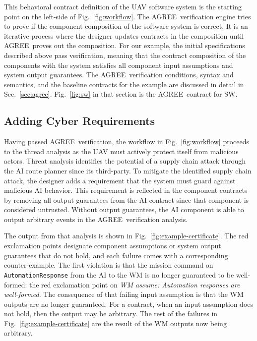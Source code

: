 \documentclass[global,twocolumn]{svjour}
\newcommand{\figref}[1]{Fig.~\ref{#1}}
\newcommand{\secref}[1]{Sec.~\ref{#1}}
\newcommand{\agr}{AGREE}
\begin{document}
This behavioral contract definition of the UAV software system is the starting point on the left-side of \figref{fig:workflow}.
%
The \agr\ verification engine tries to prove if the component composition of the software system is correct.
%
It is an iterative process where the designer updates contracts in the composition until \agr\ proves out the composition.
%
For our example, the initial specifications described above pass verification, meaning that the contract composition of the components with the system satisfies all component input assumptions and system output guarantees.
%
The \agr\ verification conditions, syntax and semantics, and the baseline contracts for the example are discussed in detail in \secref{sec:agree}.
%
\figref{fig:sw} in that section is the \agr\ contract for SW.


\subsection{Adding Cyber Requirements}

Having passed \agr\ verification, the workflow in \figref{fig:workflow} proceeds to the thread analysis as the UAV must actively protect itself from malicious actors.
%
Threat analysis identifies the potential of a supply chain attack through the AI route planner since its third-party.
%
To mitigate the identified supply chain attack, the designer adds a requirement that the system must guard against malicious AI behavior.
%
This requirement is reflected in the component contracts by removing all output guarantees from the AI contract since that component is considered untrusted.
%
Without output guarantees, the AI component is able to output arbitrary events in the \agr\ verification analysis.

The output from that analysis is shown in \figref{fig:example-certificate}.
%
The red exclamation points designate component assumptions or system output guarantees that do not hold, and each failure comes with a corresponding counter-example.
%
The first violation is that the mission command on \texttt{AutomationResponse} from the AI to the WM is no longer guaranteed to be well-formed: the red exclamation point on \emph{WM assume: Automation responses are well-formed}.
%
The consequence of that failing input assumption is that the WM outputs are no longer guaranteed.
%
For a contract, when an input assumption does not hold, then the output may be arbitrary.
%
The rest of the failures in \figref{fig:example-certificate} are the result of the WM outputs now being arbitrary.
\end{document}
